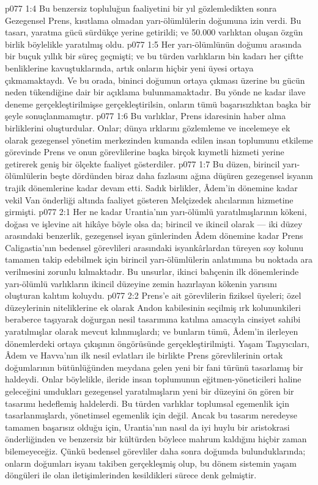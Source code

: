 \vs p077 1:4 Bu benzersiz topluluğun faaliyetini bir yıl gözlemledikten sonra Gezegensel Prens, kısıtlama olmadan yarı\hyp{}ölümlülerin doğumuna izin verdi. Bu tasarı, yaratma gücü sürdükçe yerine getirildi; ve 50.000 varlıktan oluşan özgün birlik böylelikle yaratılmış oldu.
\vs p077 1:5 Her yarı\hyp{}ölümlünün doğumu arasında bir buçuk yıllık bir süreç geçmişti; ve bu türden varlıkların bin kadarı her çiftte benliklerine kavuştuklarında, artık onların hiçbir yeni üyesi ortaya çıkmamaktaydı. Ve bu orada, bininci doğumun ortaya çıkması üzerine bu gücün neden tükendiğine dair bir açıklama bulunmamaktadır. Bu yönde ne kadar ilave deneme gerçekleştirilmişse gerçekleştirilsin, onların tümü başarısızlıktan başka bir şeyle sonuçlanmamıştır.
\vs p077 1:6 Bu varlıklar, Prens idaresinin haber alma birliklerini oluşturdular. Onlar; dünya ırklarını gözlemleme ve incelemeye ek olarak gezegensel yönetim merkezinden kumanda edilen insan toplumunu etkileme görevinde Prens ve onun görevlilerine başka birçok kıymetli hizmeti yerine getirerek geniş bir ölçekte faaliyet gösterdiler.
\vs p077 1:7 Bu düzen, birincil yarı\hyp{}ölümlülerin beşte dördünden biraz daha fazlasını ağına düşüren gezegensel isyanın trajik dönemlerine kadar devam etti. Sadık birlikler, Âdem’in dönemine kadar vekil Van önderliği altında faaliyet gösteren Melçizedek alıcılarının hizmetine girmişti.
\vs p077 2:1 Her ne kadar Urantia’nın yarı\hyp{}ölümlü yaratılmışlarının kökeni, doğası ve işlevine ait hikâye böyle olsa da; birincil ve ikincil olarak --- iki düzey arasındaki benzerlik, gezegensel isyan günlerinden Âdem dönemine kadar Prens Caligastia’nın bedensel görevlileri arasındaki isyankârlardan türeyen soy kolunu tamamen takip edebilmek için birincil yarı\hyp{}ölümlülerin anlatımına bu noktada ara verilmesini zorunlu kılmaktadır. Bu unsurlar, ikinci bahçenin ilk dönemlerinde yarı\hyp{}ölümlü varlıkların ikincil düzeyine zemin hazırlayan kökenin yarısını oluşturan kalıtım koluydu.
\vs p077 2:2 Prens’e ait görevlilerin fiziksel üyeleri; özel düzeylerinin niteliklerine ek olarak Andon kabilesinin seçilmiş ırk kolununkileri beraberce taşıyarak doğurgan nesil tasarımına katılma amacıyla cinsiyet sahibi yaratılmışlar olarak mevcut kılınmışlardı; ve bunların tümü, Âdem’in ilerleyen dönemlerdeki ortaya çıkışının öngörüsünde gerçekleştirilmişti. Yaşam Taşıyıcıları, Âdem ve Havva’nın ilk nesil evlatları ile birlikte Prens görevlilerinin ortak doğumlarının bütünlüğünden meydana gelen yeni bir fani türünü tasarlamış bir haldeydi. Onlar böylelikle, ileride insan toplumunun eğitmen\hyp{}yöneticileri haline geleceğini umdukları gezegensel yaratılmışların yeni bir düzeyini ön gören bir tasarımı hedeflemiş haldelerdi. Bu türden varlıklar toplumsal egemenlik için tasarlanmışlardı, yönetimsel egemenlik için değil. Ancak bu tasarım neredeyse tamamen başarısız olduğu için, Urantia’nın nasıl da iyi huylu bir aristokrasi önderliğinden ve benzersiz bir kültürden böylece mahrum kaldığını hiçbir zaman bilemeyeceğiz. Çünkü bedensel görevliler daha sonra doğumda bulunduklarında; onların doğumları isyanı takiben gerçekleşmiş olup, bu dönem sistemin yaşam döngüleri ile olan iletişimlerinden kesildikleri sürece denk gelmiştir.
